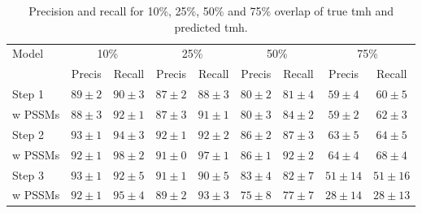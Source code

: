 \begin{table}
	\centering 
	\begin{subtable}[]{\textwidth}
		\begin{tabular}{l|c|c|c|c|c|c|c|c} 
			Model & \multicolumn{2}{|c}{10\%}& \multicolumn{2}{|c}{25\%}& \multicolumn{2}{|c}{50\%}& \multicolumn{2}{|c}{75\%}\\ 
			& Precis & Recall & Precis & Recall & Precis & Recall & Precis & Recall \\ \hline 
			Step 1  & $ 89 \pm 2 $ & $ 90 \pm 3 $ & $ 87 \pm 2 $ & $ 88 \pm 3 $ & $ 80 \pm 2 $ & $ 81 \pm 4 $ & $ 59 \pm 4 $ & $ 60 \pm 5 $ \\
			w PSSMs & $ 88 \pm 3 $ & $ 92 \pm 1 $ & $ 87 \pm 3 $ & $ 91 \pm 1 $ & $ 80 \pm 3 $ & $ 84 \pm 2 $ & $ 59 \pm 2 $ & $ 62 \pm 3 $ \\
			Step 2  & $ 93 \pm 1 $ & $ 94 \pm 3 $ & $ 92 \pm 1 $ & $ 92 \pm 2 $ & $ 86 \pm 2 $ & $ 87 \pm 3 $ & $ 63 \pm 5 $ & $ 64 \pm 5 $ \\
			w PSSMs & $ 92 \pm 1 $ & $ 98 \pm 2 $ & $ 91 \pm 0 $ & $ 97 \pm 1 $ & $ 86 \pm 1 $ & $ 92 \pm 2 $ & $ 64 \pm 4 $ & $ 68 \pm 4 $ \\
			Step 3  & $ 93 \pm 1 $ & $ 92 \pm 5 $ & $ 91 \pm 1 $ & $ 90 \pm 5 $ & $ 83 \pm 4 $ & $ 82 \pm 7 $ & $ 51 \pm 14$ & $ 51 \pm 16$ \\
			w PSSMs& $ 92 \pm 1 $ & $ 95 \pm 4 $ & $ 89 \pm 2 $ & $ 93 \pm 3 $ & $ 75 \pm 8 $ & $ 77 \pm 7 $ & $ 28 \pm 14$ & $ 28 \pm 13$ \\
		\end{tabular}
		\caption{Precision and recall for 10\%, 25\%, 50\% and 75\% overlap of true \gls{tmh} and predicted \gls{tmh}.}
		\label{tab:overlap}
	\end{subtable}


\end{table}
